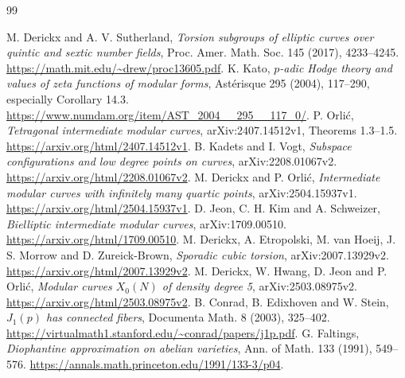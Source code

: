 \documentclass[11pt]{article}
\theoremstyle{remark}\newtheorem{remark}[theorem]{Remark}
\begin{document}
\begin{thebibliography}{99}
\raggedright
{} M. Derickx and A. V. Sutherland,
\emph{Torsion subgroups of elliptic curves over quintic and sextic number fields},
Proc. Amer. Math. Soc. 145 (2017), 4233--4245.
\url{https://math.mit.edu/~drew/proc13605.pdf}.
 K. Kato,
\emph{$p$-adic Hodge theory and values of zeta functions of modular forms},
Ast\'erisque 295 (2004), 117--290, especially Corollary 14.3.
\url{https://www.numdam.org/item/AST_2004__295__117_0/}.
 P. Orli\'c, \emph{Tetragonal intermediate modular curves},
arXiv:2407.14512v1, Theorems 1.3--1.5.
\url{https://arxiv.org/html/2407.14512v1}.
 B. Kadets and I. Vogt,
\emph{Subspace configurations and low degree points on curves},
arXiv:2208.01067v2.
\url{https://arxiv.org/html/2208.01067v2}.
 M. Derickx and P. Orli\'c,
\emph{Intermediate modular curves with infinitely many quartic points},
arXiv:2504.15937v1.
\url{https://arxiv.org/html/2504.15937v1}.
 D. Jeon, C. H. Kim and A. Schweizer,
\emph{Bielliptic intermediate modular curves}, arXiv:1709.00510.
\url{https://arxiv.org/html/1709.00510}.
 M. Derickx, A. Etropolski, M. van Hoeij, J. S. Morrow
and D. Zureick-Brown, \emph{Sporadic cubic torsion}, arXiv:2007.13929v2.
\url{https://arxiv.org/html/2007.13929v2}.
 M. Derickx, W. Hwang, D. Jeon and P. Orli\'c,
\emph{Modular curves $X_0(N)$ of density degree 5}, arXiv:2503.08975v2.
\url{https://arxiv.org/html/2503.08975v2}.
 B. Conrad, B. Edixhoven and W. Stein,
\emph{$J_1(p)$ has connected fibers}, Documenta Math. 8 (2003), 325--402.
\url{https://virtualmath1.stanford.edu/~conrad/papers/j1p.pdf}.
 G. Faltings,
\emph{Diophantine approximation on abelian varieties},
Ann. of Math. 133 (1991), 549--576.
\url{https://annals.math.princeton.edu/1991/133-3/p04}.
\end{thebibliography}
\end{document}
